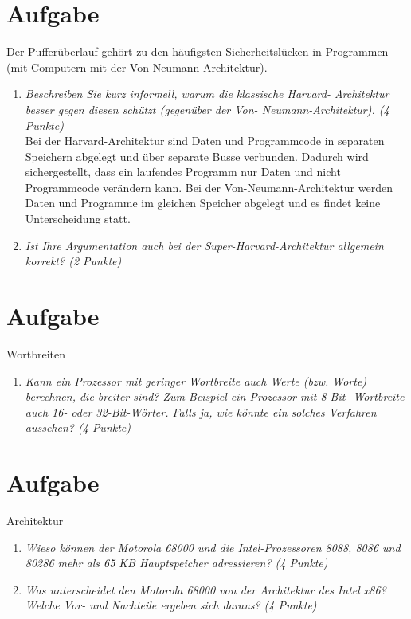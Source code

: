 \documentclass[10pt]{article}
\begin{document}
\section{Aufgabe}
Der Pufferüberlauf gehört zu den häufigsten Sicherheitslücken in Programmen (mit Computern mit der Von-Neumann-Architektur).
\begin{enumerate}[label=\alph*)]
	\item 
	\textit{Beschreiben Sie kurz informell, warum die klassische Harvard- Architektur besser gegen diesen schützt (gegenüber der Von- Neumann-Architektur). (4 Punkte)} \\
	Bei der Harvard-Architektur sind Daten und Programmcode in separaten Speichern abgelegt und über separate Busse verbunden. Dadurch wird sichergestellt, dass ein laufendes Programm nur Daten und nicht Programmcode verändern kann. Bei der Von-Neumann-Architektur werden Daten und Programme im gleichen Speicher abgelegt und es findet keine Unterscheidung statt.
	\item
	\textit{Ist Ihre Argumentation auch bei der Super-Harvard-Architektur allgemein korrekt? (2 Punkte)} \\
	
\end{enumerate}


\section{Aufgabe}
Wortbreiten
\begin{enumerate}[label=\alph*)]
	\item 
	\textit{Kann ein Prozessor mit geringer Wortbreite auch Werte (bzw. Worte) berechnen, die breiter sind? Zum Beispiel ein Prozessor mit 8-Bit- Wortbreite auch 16- oder 32-Bit-Wörter. Falls ja, wie könnte ein solches Verfahren aussehen? (4 Punkte)} \\
	
\end{enumerate}
\newpage





\section{Aufgabe}
Architektur
\begin{enumerate}[label=\alph*)]
	\item 
	\textit{Wieso können der Motorola 68000 und die Intel-Prozessoren 8088, 8086 und 80286 mehr als 65 KB Hauptspeicher adressieren?
(4 Punkte)	} \\
	
	\item
	\textit{Was unterscheidet den Motorola 68000 von der Architektur des Intel x86? Welche Vor- und Nachteile ergeben sich daraus? (4 Punkte)}\\
	
\end{enumerate}
\newpage
\end{document}
